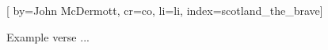 

[%
    by={John McDermott},
    cr={co},
    li={li},
    index={scotland_the_brave}]


    \label{scotland_the_brave}

    \beginverse
        Example verse ...
    \endverse
\endsong
